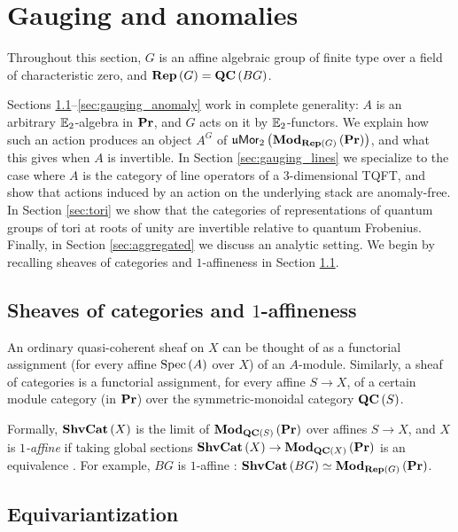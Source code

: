 \section{Gauging and anomalies}
\label{sec:gauging}

Throughout this section, $G$ is an affine algebraic group of finite type over a field of
characteristic zero, and $\mathbf{Rep}\left(G\right) = \mathbf{QC}\left(BG\right)$.

Sections \ref{sec:shvcat}--\ref{sec:gauging_anomaly} work in complete generality: $A$ is an
arbitrary $\mathbb{E}_2$-algebra in $\mathbf{Pr}$, and $G$ acts on it by $\mathbb{E}_2$-functors. We explain how such
an action produces an object $A^G$ of $\mathfrak{u}\mathsf{Mor}_2\left(\mathbf{Mod}_{\mathbf{Rep}\left(G\right)}\left(\mathbf{Pr}\right)\right)$,
and what this gives when $A$ is invertible. In Section \ref{sec:gauging_lines} we specialize to the
case where $A$ is the category of line operators of a $3$-dimensional TQFT, and show that actions
induced by an action on the underlying stack are anomaly-free. In Section \ref{sec:tori} we show that the categories of representations
of quantum groups of tori at roots of unity are invertible relative to quantum Frobenius.
Finally, in Section \ref{sec:aggregated} we discuss an analytic setting.
We begin by recalling sheaves of categories and $1$-affineness in Section \ref{sec:shvcat}.

\subsection{Sheaves of categories and \texorpdfstring{$1$}{1}-affineness}
\label{sec:shvcat}

An ordinary quasi-coherent sheaf on $X$ can be thought of as a functorial assignment
(for every affine $\operatorname{Spec} \left(A\right)$ over $X$) of an $A$-module.
Similarly, a sheaf of categories is a functorial assignment, for every affine $S \to X$,
of a certain module category (in $\mathbf{Pr}$) over the symmetric-monoidal category
$\mathbf{QC}\left(S\right)$.

Formally, $\mathbf{ShvCat}\left(X\right)$ is the limit of $\mathbf{Mod}_{\mathbf{QC}\left(S\right)}\left(\mathbf{Pr}\right)$ over affines
$S\to X$, and $X$ is \emph{$1$-affine} if taking global sections
$\mathbf{ShvCat}\left(X\right)\to\mathbf{Mod}_{\mathbf{QC}\left(X\right)}\left(\mathbf{Pr}\right)$ is an equivalence \cite{G:ShvCat}.
For example, $BG$ is $1$-affine \cite[Theorem 2.2.2]{G:ShvCat}:
$\mathbf{ShvCat}\left(BG\right)\simeq\mathbf{Mod}_{\mathbf{Rep}\left(G\right)}\left(\mathbf{Pr}\right)$.

\subsection{Equivariantization}
\label{sec:gauging_general}

